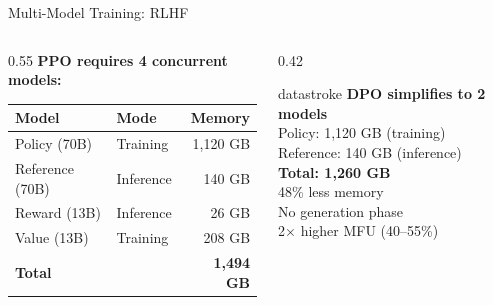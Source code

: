 \documentclass[aspectratio=169, 12pt]{beamer}
\begin{document}
\begin{frame}{Multi-Model Training: RLHF}
\small
\begin{columns}[T]
  \begin{column}{0.55\textwidth}
    \textbf{PPO requires 4 concurrent models:}
    \vspace{0.1cm}
    {\footnotesize
    \renewcommand{\arraystretch}{1.15}
    \begin{tabular}{@{}llr@{}}
      \toprule
      \textbf{Model} & \textbf{Mode} & \textbf{Memory} \\
      \midrule
      Policy (70B)   & Training  & 1,120 GB \\
      Reference (70B) & Inference & 140 GB \\
      Reward (13B)   & Inference & 26 GB \\
      Value (13B)    & Training  & 208 GB \\
      \midrule
      \textbf{Total} & & \textbf{1,494 GB} \\
      \bottomrule
    \end{tabular}
    }
  \end{column}
  \begin{column}{0.42\textwidth}
    \begin{mlsyscard}{datastroke}
    \textbf{DPO simplifies to 2 models}\\[0.1cm]
    {\footnotesize
    Policy: 1,120 GB (training)\\
    Reference: 140 GB (inference)\\
    \textbf{Total: 1,260 GB}\\[0.1cm]
    48\% less memory\\
    No generation phase\\
    2$\times$ higher MFU (40--55\%)
    }
    \end{mlsyscard}
  \end{column}
\end{columns}

\end{frame}
\end{document}
